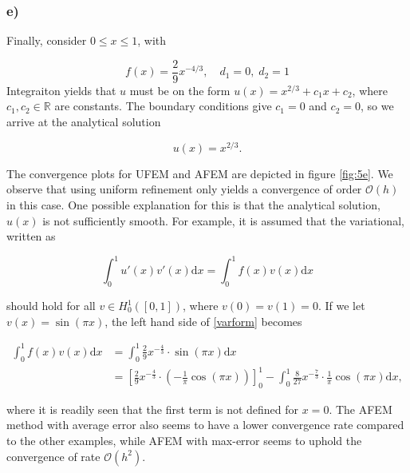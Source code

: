 \subsubsection{e)}
Finally, consider $0 \le x \le 1$, with

\begin{equation}
    f(x) = \frac{2}{9}x^{-4/3}, \quad d_1 = 0, \; d_2 = 1
\label{5e}
\end{equation}
Integraiton yields that $u$ must be on the form $u(x) = x^{2/3} + c_1x + c_2$, where $c_1,c_2 \in \mathbb{R}$ are constants. The boundary conditions give $c_1 = 0$ and  $c_2 = 0$, so we arrive at the analytical solution

\begin{equation}
    u(x) = x^{2/3}.
\end{equation}

\noindent The convergence plots for UFEM and AFEM are depicted in figure \ref{fig:5e}. We observe that using uniform refinement only yields a convergence of order $\mathcal{O}(h)$ in this case. One possible explanation for this is that the analytical solution, $u(x)$ is not sufficiently smooth. For example, it is assumed that the variational, written as

\begin{equation}
    \int_0^1 u'(x) v'(x) \mathrm{d}x= \int_0^1 f(x)v(x) \mathrm{d}x
\label{varform}
\end{equation}

\noindent should hold for all $v \in H_0^1([0,1])$, where $v(0) = v(1) = 0$. If we let $v(x) = \sin(\pi x)$, the left hand side of \eqref{varform} becomes

\begin{equation}
\begin{split}
    \int_0^1 f(x)v(x) \mathrm{d}x &= \int_0^1 \frac{2}{9}x^{-\frac{4}{3}} \cdot \sin(\pi x) \mathrm{d}x \\
    &= \left[\frac{2}{9}x^{-\frac{4}{3}} \cdot (-\frac{1}{\pi}\cos(\pi x))\right]_0^1 - \int_0^1  \frac{8}{27} x^{-\frac{7}{3}} \cdot \frac{1}{\pi}\cos(\pi x) \mathrm{d}x,
\end{split}
\end{equation}

\noindent where it is readily seen that the first term is not defined for $x = 0$. The AFEM method with average error also seems to have a lower convergence rate compared to the other examples, while AFEM with max-error seems to uphold the convergence of rate $\mathcal{O}(h^2)$.

